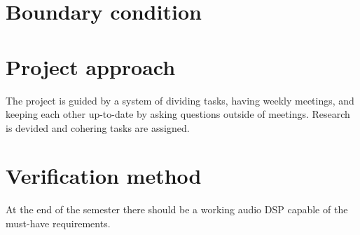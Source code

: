 \section{Boundary condition}

\section{Project approach}

The project is guided by a system of dividing tasks, having weekly meetings, and keeping each other up-to-date by asking questions outside of meetings. Research is devided and cohering tasks are assigned.

\section{Verification method}

At the end of the semester there should be a working audio DSP capable of the must-have requirements. 

